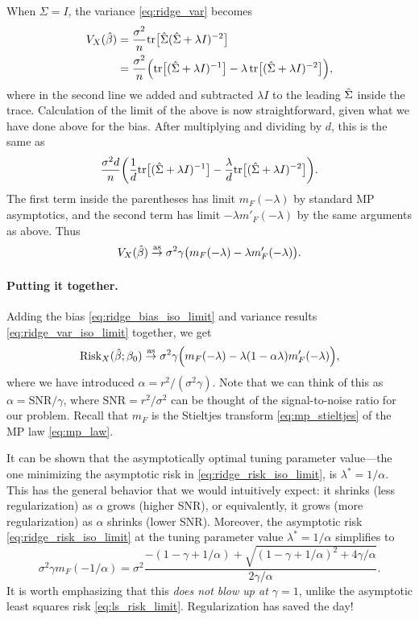 \documentclass{article}
\begin{document}
When $\Sigma = I$, the variance \eqref{eq:ridge_var} becomes 
\begin{align*}
V_X(\hat{\beta})
&= \frac{\sigma^2}{n} \mathrm{tr} \big[ \hat\Sigma ( \hat\Sigma + \lambda I)^{-2} \big] \\ 
&=\frac{\sigma^2}{n} \Big( \mathrm{tr} \big[ ( \hat\Sigma + \lambda I)^{-1} \big] - 
\lambda \, \mathrm{tr} \big[ (\hat\Sigma + \lambda I)^{-2} \big] \Big),
\end{align*}
where in the second line we added and subtracted $\lambda I$ to the leading
$\hat\Sigma$ inside the trace. Calculation of the limit of the above is now
straightforward, given what we have done above for the bias. After multiplying 
and dividing by $d$, this is the same as 
\[
\frac{\sigma^2 d}{n} \bigg( \frac{1}{d} \mathrm{tr} \big[ ( \hat\Sigma + \lambda I)^{-1} 
\big] - \frac{\lambda}{d} \mathrm{tr} \big[ (\hat\Sigma + \lambda I)^{-2} \big] \bigg).  
\]
The first term inside the parentheses has limit $m_F(-\lambda)$ by standard MP
asymptotics, and the second term has limit $-\lambda m'_F(-\lambda)$ by the same
arguments as above. Thus   
\begin{equation}
\label{eq:ridge_var_iso_limit}
V_X(\hat{\beta}) \overset{\mathrm{as}}{\to} \sigma^2 \gamma \big( m_F(-\lambda) - \lambda 
m'_F(-\lambda) \big).
\end{equation}

\paragraph{Putting it together.}

Adding the bias \eqref{eq:ridge_bias_iso_limit} and variance results
\eqref{eq:ridge_var_iso_limit} together, we get
\begin{equation}
\label{eq:ridge_risk_iso_limit}
\mathrm{Risk}_X(\hat{\beta}; \beta_0) \overset{\mathrm{as}}{\to} \sigma^2 \gamma 
\Big( m_F(-\lambda) - \lambda (1 - \alpha \lambda) m'_F(-\lambda) \Big), 
\end{equation}
where we have introduced $\alpha = r^2 / (\sigma^2 \gamma)$. Note that we can
think of this as $\alpha = \mathrm{SNR} / \gamma$, where $\mathrm{SNR} = r^2 /
\sigma^2$ can be thought of the signal-to-noise ratio for our problem. Recall
that $m_F$ is the Stieltjes transform \eqref{eq:mp_stieltjes} of the MP law
\eqref{eq:mp_law}. 

It can be shown that the asymptotically optimal tuning parameter value---the one
minimizing the asymptotic risk in \eqref{eq:ridge_risk_iso_limit}, is $\lambda^*
= 1/\alpha$. This has the general behavior that we would intuitively expect: it
shrinks (less regularization) as $\alpha$ grows (higher SNR), or equivalently,
it grows (more regularization) as $\alpha$ shrinks (lower SNR). Moreover, the
asymptotic risk \eqref{eq:ridge_risk_iso_limit} at the tuning parameter value
$\lambda^* = 1/\alpha$ simplifies to      
\[
\sigma^2 \gamma m_F(-1/\alpha) = \sigma^2 \frac{-(1 - \gamma + 1/\alpha) + 
  \sqrt{(1 - \gamma + 1/\alpha)^2 + 4\gamma / \alpha}}{2\gamma /\alpha}.     
\]
It is worth emphasizing that this \emph{does not blow up at $\gamma = 1$}, 
unlike the asymptotic least squares risk \eqref{eq:ls_risk_limit}. 
Regularization has saved the day! 
\end{document}
